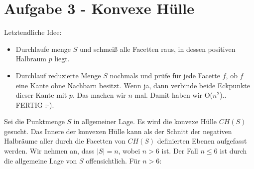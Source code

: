 \documentclass[a4paper]{article}
\begin{document}
\section*{Aufgabe 3 - Konvexe Hülle}

Letztendliche Idee:
\begin{itemize}
 \item Durchlaufe menge $S$ und schmeiß alle Facetten raus, in dessen positiven Halbraum $p$ liegt.
 \item Durchlauf reduzierte Menge $S$ nochmals und prüfe für jede Facette $f$, ob $f$ eine Kante ohne Nachbarn besitzt.
 Wenn ja, dann verbinde beide Eckpunkte dieser Kante mit $p$. Das machen wir $n$ mal. Damit haben wir O($n^2$)..
 FERTIG :-).
 
 
\end{itemize}


Sei die Punktmenge $S$ in allgemeiner Lage.
Es wird die konvexe Hülle $CH(S)$ gesucht. Das Innere der konvexen Hülle kann als der Schnitt der negativen Halbräume aller durch die Facetten von $CH(S)$ definierten Ebenen aufgefasst werden.
Wir nehmen an, dass $|S| = n$, wobei $n > 6$ ist. 
Der Fall $n \leq 6$ ist durch die allgemeine Lage von $S$ offensichtlich. Für $n > 6$:
\end{document}
